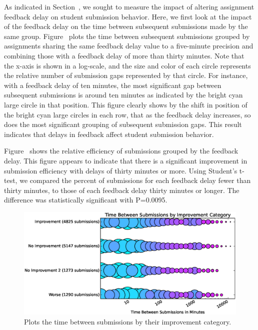 As indicated in Section~, we sought to measure the impact
of altering assignment feedback delay on student submission behavior. Here, we
first look at the impact of the feedback delay on the time between subsequent
submissions made by the same group. Figure~ plots the
time between subsequent submissions grouped by assignments sharing the same
feedback delay value to a five-minute precision and combining those with a
feedback delay of more than thirty minutes. Note that the x-axis is shown in a
log-scale, and the size and color of each circle represents the relative number
of submission gaps represented by that circle. For instance, with a feedback
delay of ten minutes, the most significant gap between subsequent submissions
is around ten minutes as indicated by the bright cyan large circle in that
position. This figure clearly shows by the shift in position of the bright cyan
large circles in each row, that as the feedback delay increases, so does the
most significant grouping of subsequent submission gaps. This result indicates
that delays in feedback affect student submission behavior.

Figure~ shows the relative efficiency of
submissions grouped by the feedback delay. This figure appears to indicate that
there is a significant improvement in submission efficiency with delays of
thirty minutes or more. Using Student's t-test, we compared the percent of
\imp{} submissions for each feedback delay fewer than thirty minutes, to those
of each feedback delay thirty minutes or longer. The difference was
statistically significant with P=0.0095.

\begin{figure}[!t]
\centering \includegraphics[width=5.75in]{graphs/Time_Between_Submissions_by_Improvement_Category.eps}
\caption{Plots the time between submissions by their improvement category.}
\end{figure}

